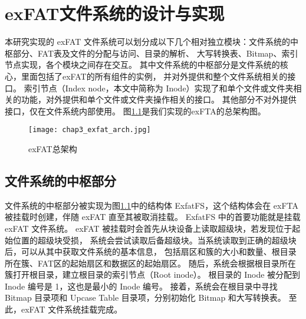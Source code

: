 
\chapter{exFAT文件系统的设计与实现}
本研究实现的 exFAT 文件系统可以划分成以下几个相对独立模块：文件系统的中枢部分、FAT表及文件的分配与访问、目录的解析、
大写转换表、Bitmap、索引节点实现，各个模块之间存在交互。
其中文件系统的中枢部分是文件系统的核心，里面包括了exFAT的所有组件的实例，
并对外提供和整个文件系统相关的接口。
索引节点（Index node，本文中简称为 Inode）实现了和单个文件或文件夹相关的功能，对外提供和单个文件或文件夹操作相关的接口。
其他部分不对外提供接口，仅在文件系统内部使用。
图\ref{fig:exfat_arch}是我们实现的exFTA的总架构图。

\begin{figure}[h]
    \centering
    \texttt{[image: chap3\_exfat\_arch.jpg]}
    \caption{exFAT总架构}
    \label{fig:exfat_arch}
\end{figure}
\section{文件系统的中枢部分}
文件系统的中枢部分被实现为图\ref{fig:exfat_arch}中的结构体 ExfatFS，这个结构体会在 exFTA 被挂载时创建，伴随 exFAT 直至其被取消挂载。
ExfatFS 中的首要功能就是挂载 exFAT 文件系统。
exFAT 被挂载时会首先从块设备上读取超级块，若发现位于起始位置的超级块受损，
系统会尝试读取后备超级块。当系统读取到正确的超级块后，可以从其中获取文件系统的基本信息，
包括扇区和簇的大小和数量、根目录所在簇、FAT区的起始扇区和数据区的起始扇区。
随后，系统会根据根目录所在簇打开根目录，建立根目录的索引节点（Root inode）。
根目录的 Inode 被分配到 Inode 编号是 1，这也是最小的 Inode 编号。
接着，系统会在根目录中寻找 Bitmap 目录项和 Upcase Table 目录项，分别初始化 Bitmap 和大写转换表。
至此，exFAT 文件系统挂载完成。


